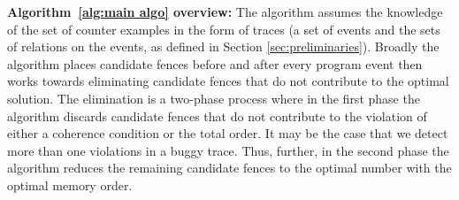 \begin{algorithm}[h]
%		
%			
%		
%		
%		
%		
\end{algorithm}

\noindent
{\bf Algorithm~\ref{alg:main algo} overview:} 
The algorithm assumes the knowledge of the set of counter
examples in the form of traces (\ie a set of events and 
the sets of relations on the events, as defined in Section
\ref{sec:preliminaries}).
%
Broadly the algorithm places candidate fences before and
after every program event then works towards eliminating 
candidate
fences that do not contribute to the optimal solution.
%
The elimination is a two-phase process where in the first
phase the algorithm discards candidate fences that do not 
contribute to the violation of either a coherence condition 
or the \sc total order. 
It may be the case that we detect more than one violations
 in a buggy trace.
Thus, further, in the second phase the algorithm reduces the 
remaining candidate fences to the optimal number with
the optimal memory order.

